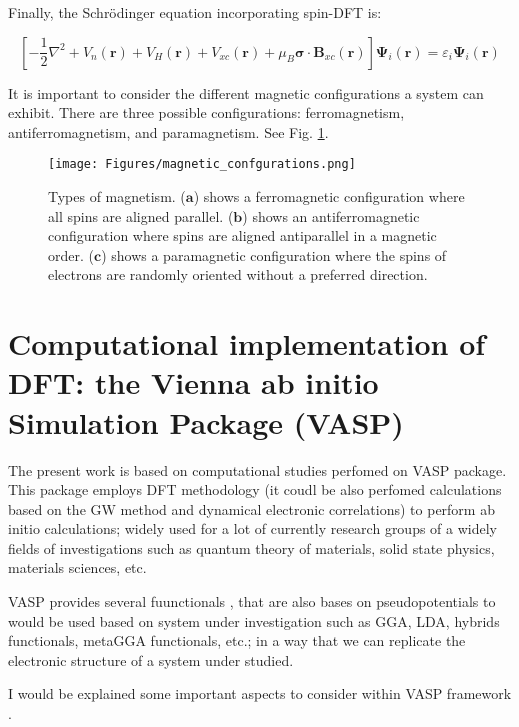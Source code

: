 Finally, the Schrödinger equation incorporating spin-DFT is:

\begin{equation}
	\left[-\frac{1}{2} \nabla^{2} + V_{n}(\mathbf{r}) + V_{H}(\mathbf{r}) + V_{xc}(\mathbf{r}) + \mu_{B} \mathbf{\sigma} \cdot \mathbf{B}_{xc}(\mathbf{r})\right] \mathbf{\Psi}_{i}(\mathbf{r}) = \varepsilon_{i} \mathbf{\Psi}_{i}(\mathbf{r})
\end{equation}


It is important to consider the different magnetic configurations a system can exhibit. There are three possible configurations: ferromagnetism, antiferromagnetism, and paramagnetism. See Fig. \ref{fig:magnetictypes}.

\begin{figure}[H]
	\centering
	\texttt{[image: Figures/magnetic\_confgurations.png]}
	\caption{Types of magnetism. ($\mathbf{a}$) shows a ferromagnetic configuration where all spins are aligned parallel. ($\mathbf{b}$) shows an antiferromagnetic configuration where spins are aligned antiparallel in a magnetic order. ($\mathbf{c}$) shows a paramagnetic configuration where the spins of electrons are randomly oriented without a preferred direction.}
	\label{fig:magnetictypes}
\end{figure}

\section{Computational implementation of DFT: the Vienna ab initio Simulation
	Package (VASP)}
\label{section.VASP}

The present work  is based on computational studies perfomed on VASP package.  This package   employs  DFT methodology (it coudl be also perfomed calculations based on the GW method and dynamical electronic correlations) to perform  ab initio calculations; widely used for a lot of currently research groups  of a widely fields of investigations such as quantum  theory of materials, solid state physics, materials sciences, etc.

VASP provides several fuunctionals , that are also bases on pseudopotentials to would be used based on system under  investigation such as GGA, LDA, hybrids functionals, metaGGA functionals, etc.;  in a way that we can replicate the electronic structure of a system under studied. 

I would be explained some  important aspects to consider within VASP framework .

